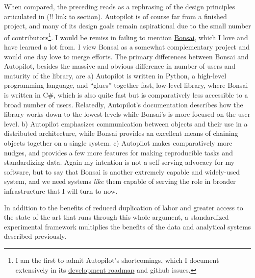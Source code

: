 \documentclass{article}
\begin{document}
When compared, the preceding reads as a rephrasing of the design
principles articulated in (!! link to section). Autopilot is of course
far from a finished project, and many of its design goals remain
aspirational due to the small number of contributors\footnote{I am the
  first to admit Autopilot's shortcomings, which I document extensively
  in its
  \href{https://docs.auto-pi-lot.com/en/latest/todo.html}{development
  roadmap} and github issues.}. I would be remiss in failing to mention
\href{https://bonsai-rx.org/}{Bonsai}, which I love and have learned a
lot from. I view Bonsai as a somewhat complementary project and would
one day love to merge efforts. The primary differences between Bonsai
and Autopilot, besides the massive and obvious difference in number of
users and maturity of the library, are a) Autopilot is written in
Python, a high-level programming language, and ``glues'' together fast,
low-level library, where Bonsai is written in C\#, which is also quite
fast but is comparatively less accessible to a broad number of users.
Relatedly, Autopilot's documentation describes how the library works
down to the lowest levels while Bonsai's is more focused on the user
level. b) Autopilot emphasizes communication between objects and their
use in a distributed architecture, while Bonsai provides an excellent
means of chaining objects together on a single system. c) Autopilot
makes comparatively more nudges, and provides a few more features for
making reproducible tasks and standardizing data. Again my intention is
not a self-serving advocacy for my software, but to say that Bonsai is
another extremely capable and widely-used system, and we need systems
\emph{like} them capable of serving the role in broader infrastructure
that I will turn to now.

In addition to the benefits of reduced duplication of labor and greater
access to the state of the art that runs through this whole argument, a
standardized experimental framework multiplies the benefits of the data
and analytical systems described previously.
\end{document}
